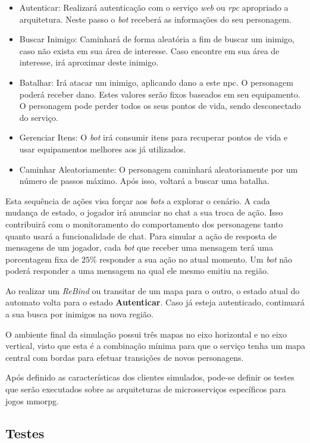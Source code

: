 \begin{itemize}
  \item Autenticar: Realizará autenticação com o serviço \textit{web} ou \textit{rpc} apropriado a arquitetura. Neste passo o \textit{bot} receberá as informações do seu personagem.
  \item Buscar Inimigo: Caminhará de forma aleatória a fim de buscar um inimigo, caso não exista em sua área de interesse. Caso encontre em sua área de interesse, irá aproximar deste inimigo.
  \item Batalhar: Irá atacar um inimigo, aplicando dano a este \ac{npc}. O personagem poderá receber dano. Estes valores serão fixos baseados em seu equipamento. O personagem pode perder todos os seus pontos de vida, sendo desconectado do serviço.
  \item Gerenciar Itens: O \textit{bot} irá consumir itens para recuperar pontos de vida e usar equipamentos melhores aos já utilizados.
  \item Caminhar Aleatoriamente: O personagem caminhará aleatoriamente por um número de passos máximo. Após isso, voltará a buscar uma batalha.
\end{itemize}

Esta sequência de ações visa forçar aos \textit{bots} a explorar o cenário.
%
A cada mudança de estado, o jogador irá anunciar no chat a sua troca de ação.
%
Isso contribuirá com o monitoramento do comportamento dos personagens tanto quanto usará a funcionalidade de chat.
%
Para simular a ação de resposta de mensagens de um jogador, cada \textit{bot} que receber uma mensagem terá uma porcentagem fixa de $25\%$ responder a sua ação no atual momento.
%
Um \textit{bot} não poderá responder a uma mensagem na qual ele mesmo emitiu na região.


Ao realizar um \textit{ReBind} ou transitar de um mapa para o outro, o estado atual do automato volta para o estado \textbf{Autenticar}.
%
Caso já esteja autenticado, continuará a sua busca por inimigos na nova região.

O ambiente final da simulação possui três mapas no eixo horizontal e no eixo vertical, visto que esta é a combinação mínima para que o serviço tenha um mapa central com bordas para efetuar transições de novos personagens.

Após definido as características dos clientes simulados, pode-se definir os testes que serão executados sobre as arquiteturas de microsserviços específicos para jogos \ac{mmorpg}.

\subsection{Testes}

